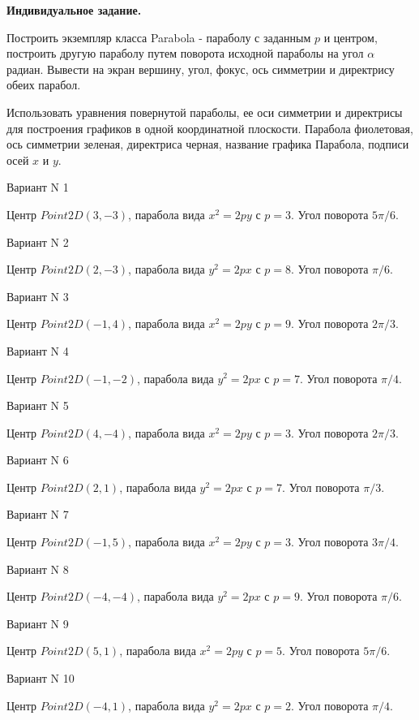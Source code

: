 \documentclass[11pt]{report}
\begin{document}
\pagestyle{empty}

{\bf Индивидуальное задание.}


Построить экземпляр класса Parabola - параболу с заданным $p$ и центром, построить другую параболу путем поворота исходной параболы  на угол $\alpha$ радиан. 
Вывести на экран вершину, угол, фокус, ось симметрии и директрису обеих парабол. 

Использовать уравнения повернутой параболы, ее оси симметрии и директрисы для построения графиков в одной координатной плоскости. 
Парабола фиолетовая, ось симметрии зеленая, директриса черная, название графика Парабола, подписи осей $x$ и $y$.

Вариант N 1

Центр $Point2D\left(3, -3\right)$, парабола вида $x^{2} = 2py$ с $p = 3$. Угол поворота $5 \pi / 6$.

Вариант N 2

Центр $Point2D\left(2, -3\right)$, парабола вида $y^{2} = 2px$ с $p = 8$. Угол поворота $\pi / 6$.

Вариант N 3

Центр $Point2D\left(-1, 4\right)$, парабола вида $x^{2} = 2py$ с $p = 9$. Угол поворота $2 \pi / 3$.

Вариант N 4

Центр $Point2D\left(-1, -2\right)$, парабола вида $y^{2} = 2px$ с $p = 7$. Угол поворота $\pi / 4$.

Вариант N 5

Центр $Point2D\left(4, -4\right)$, парабола вида $x^{2} = 2py$ с $p = 3$. Угол поворота $2 \pi / 3$.

Вариант N 6

Центр $Point2D\left(2, 1\right)$, парабола вида $y^{2} = 2px$ с $p = 7$. Угол поворота $\pi / 3$.

Вариант N 7

Центр $Point2D\left(-1, 5\right)$, парабола вида $x^{2} = 2py$ с $p = 3$. Угол поворота $3 \pi / 4$.

Вариант N 8

Центр $Point2D\left(-4, -4\right)$, парабола вида $y^{2} = 2px$ с $p = 9$. Угол поворота $\pi / 6$.

Вариант N 9

Центр $Point2D\left(5, 1\right)$, парабола вида $x^{2} = 2py$ с $p = 5$. Угол поворота $5 \pi / 6$.

Вариант N 10

Центр $Point2D\left(-4, 1\right)$, парабола вида $y^{2} = 2px$ с $p = 2$. Угол поворота $\pi / 4$.
\end{document}
